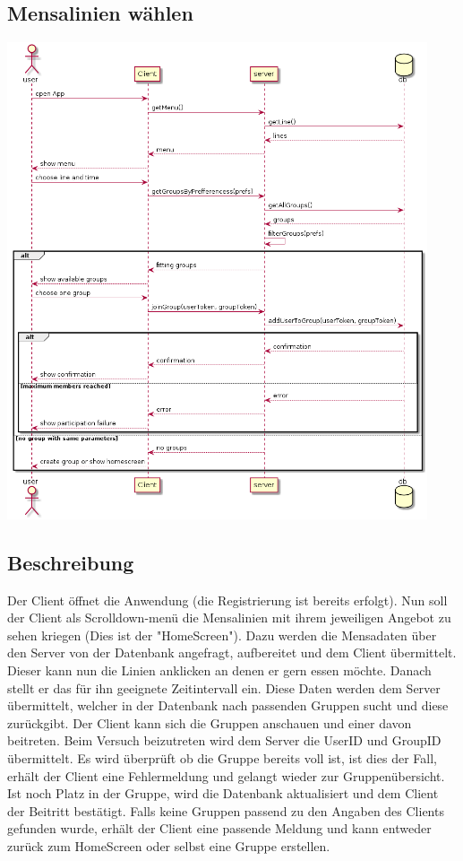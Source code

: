 \documentclass[a4paper]{scrreprt}
\begin{document}
\subsection{Mensalinien wählen}
\begin{center}
	\includegraphics[width=0.93\textwidth]{Sequenzdiagramme/chooseLineAndTimeSD.png}
\end{center}
\subsection*{Beschreibung}
Der Client öffnet die Anwendung (die Registrierung ist bereits erfolgt). Nun soll der Client als Scrolldown-menü die Mensalinien mit ihrem jeweiligen Angebot zu sehen kriegen (Dies ist der "HomeScreen"). Dazu werden die Mensadaten über den Server von der Datenbank angefragt, aufbereitet und dem Client übermittelt. Dieser kann nun die Linien anklicken an denen er gern essen möchte. Danach stellt er das für ihn geeignete Zeitintervall ein. Diese Daten werden dem Server übermittelt, welcher in der Datenbank nach passenden Gruppen sucht und diese zurückgibt. Der Client kann sich die Gruppen anschauen und einer davon beitreten. Beim Versuch beizutreten wird dem Server die UserID und GroupID übermittelt. Es wird überprüft ob die Gruppe bereits voll ist, ist dies der Fall, erhält der Client eine Fehlermeldung und gelangt wieder zur Gruppenübersicht. Ist noch Platz in der Gruppe, wird die Datenbank aktualisiert und dem Client der Beitritt bestätigt. 
Falls keine Gruppen passend zu den Angaben des Clients gefunden wurde, erhält der Client eine passende Meldung und kann entweder zurück zum HomeScreen oder selbst eine Gruppe erstellen.
\end{document}
